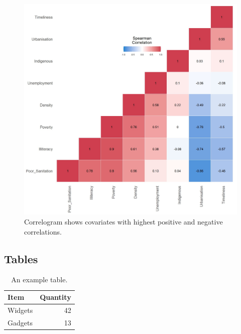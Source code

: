 \begin{figure}[H]
\centering
\includegraphics[scale=0.5]{spearman_correl.jpg}
\caption{\label{fig:spearman_correl}Correlogram shows covariates with highest positive and negative correlations.}
\end{figure}

\subsection{Tables}

\begin{table}[H]
\centering
\begin{tabular}{l|r}
Item & Quantity \\\hline
Widgets & 42 \\
Gadgets & 13
\end{tabular}
\caption{\label{tab:widgets}An example table.}
\end{table}

